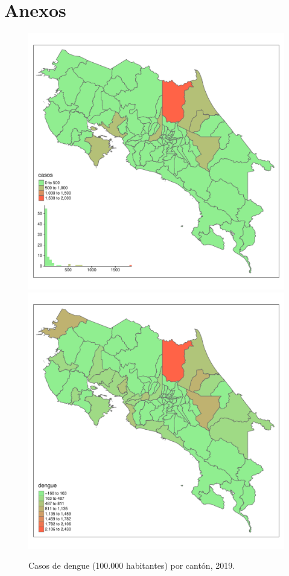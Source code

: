 \documentclass[12pt,a4paper]{article}
\begin{document}
\section{Anexos}

\begin{figure}[hbtp]
\centering
\includegraphics[width=.48\textwidth]{FA1.pdf}
\includegraphics[width=.48\textwidth]{FA2.pdf}
\caption{Casos de dengue (100.000 habitantes) por cantón, 2019.}
\end{figure}
\end{document}
